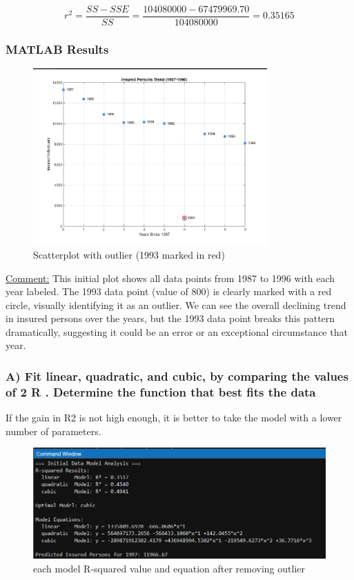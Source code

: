 \documentclass[12pt]{article}
\begin{document}
\[
r^2 = \frac{SS - SSE}{SS} =\frac{104080000 - 67479969.70}{104080000} = 0.35165
\]

\subsubsection*{MATLAB Results}
\begin{figure}[H]
    \centering
    \includegraphics[width=0.8\textwidth]{1.png}
    \caption{Scatterplot with outlier (1993 marked in red)}
\end{figure}

\uline{Comment:} This initial plot shows all data points from 1987 to 1996 with each year labeled. The 1993 data point (value of 800) is clearly marked with a red circle, visually identifying it as an outlier. We can see the overall declining trend in insured persons over the years, but the 1993 data point breaks this pattern dramatically, suggesting it could be an error or an exceptional circumstance that year.


\subsubsection*{A) Fit linear, quadratic, and cubic, by comparing the values of 2 R . Determine the function that best fits the data}
If the gain in R2 is not high enough, it is better to take the model with a lower number of parameters.
    \begin{figure}[H]
    \centering
    \includegraphics[width=0.8\linewidth]{2.png}
    \caption{each model R-squared value and equation after removing outlier}
    \label{fig:enter-label}
    \end{figure}
\end{document}
